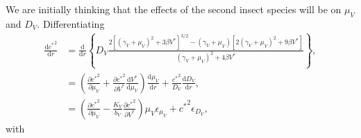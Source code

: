 \documentclass{article}
\newcommand{\md}{\mathrm{d}}
\begin{document}
We are initially thinking that the effects of the second insect
species will be on $\mu_V$ and $D_V$.  Differentiating
\begin{equation}
  \begin{split}
    \frac{\md {c^*}^2}{\md r}
    &=
    \frac{\md}{\md r} \left\{
      D_V
      \frac{2 \left[(\gamma_V + \mu_V)^2 + 3 \beta V^*\right]^{3/2}
        - (\gamma_V + \mu_V) \left[2 (\gamma_V + \mu_V)^2 + 9 \beta V^*\right]}
      {(\gamma_V + \mu_V)^2 + 4 \beta V^*}
    \right\},
    \\
    &=
    \left(
      \frac{\partial {c^*}^2}{\partial \mu_V}
      +
      \frac{\partial {c^*}^2}{\partial V^*} \frac{\md V^*}{\md \mu_V}
    \right)
    \frac{\md \mu_V}{\md r}
    +
    \frac{{c^*}^2}{D_V} \frac{\md D_V}{\md r},
    \\
    &=
    \left(
      \frac{\partial {c^*}^2}{\partial \mu_V}
      -
      \frac{K_V}{b_V}
      \frac{\partial {c^*}^2}{\partial V^*}
    \right)
    \mu_V \epsilon_{\mu_V}
    +
    {c^*}^2 \epsilon_{D_V},
  \end{split}
\end{equation}
with
\end{document}
